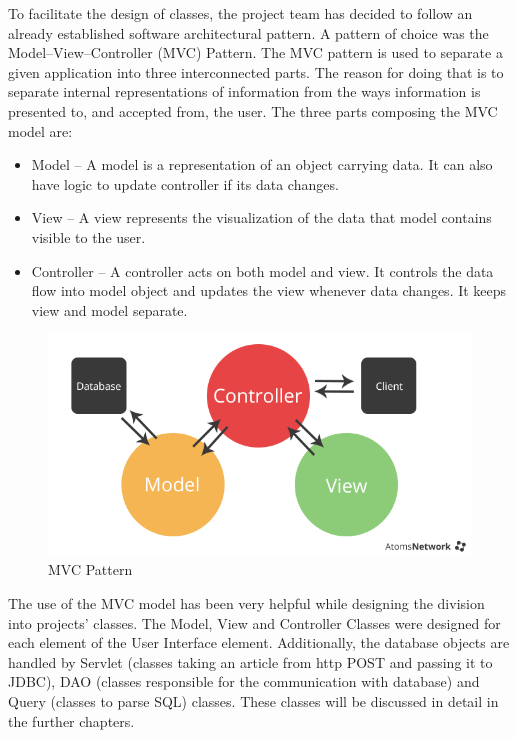 \documentclass[a4paper,11pt,twoside]{report}
\theoremstyle{definition}
\begin{document}
To facilitate the design of classes, the project team has decided to follow an already established software architectural pattern. A pattern of choice was the Model–View–Controller (MVC) Pattern.
The MVC pattern is used to separate a given application into three interconnected parts. The reason for doing that is to separate internal representations of information from the ways information is presented to, and accepted from, the user. The three parts composing the MVC model are: 
\begin{itemize}
\item Model – A model is a representation of an object carrying data. It can also have logic to update controller if its data changes.
\item View – A view represents the visualization of the data that model contains visible to the user.
\item Controller – A controller acts on both model and view. It controls the data flow into model object and updates the view whenever data changes. It keeps view and model separate. \cite{F} \cite{G}
 
 
\end{itemize}
\begin{figure}[h!]

\begin{center}

\includegraphics[width=\textwidth]{mvc}

\end{center}
\caption{MVC Pattern}
\end{figure}


The use of the MVC model has been very helpful while designing the division into projects’ classes. The Model, View and Controller Classes were designed for each element of the User Interface element.  Additionally, the database objects are handled by Servlet (classes taking an article from http POST and passing it to JDBC), DAO (classes responsible for the communication with database) and Query (classes to parse SQL) classes. These classes will be discussed in detail in the further chapters.
\end{document}
